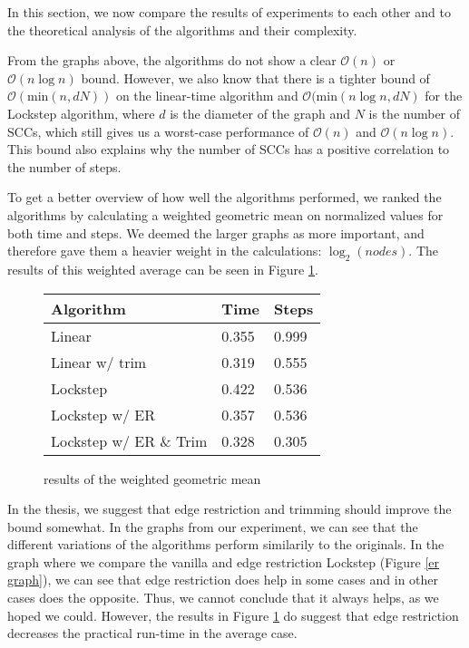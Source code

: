 \documentclass[../master/master.tex]{subfiles}
\begin{document}
In this section, we now compare the results of experiments to each other and to the theoretical analysis of the algorithms and their complexity.

From the graphs above, the algorithms do not show a clear $\mathcal{O}(n)$ or $\mathcal{O}(n\log n)$ bound. However, we also know that there is a tighter bound of $\mathcal{O}(\text{min}(n, dN))$ on the linear-time algorithm and $\mathcal{O}(\text{min}(n\log n, dN)$ for the Lockstep algorithm, where $d$ is the diameter of the graph and $N$ is the number of SCCs, which still gives us a worst-case performance of $\mathcal{O}(n)$ and $\mathcal{O}(n\log n)$. This bound also explains why the number of SCCs has a positive correlation to the number of steps.

To get a better overview of how well the algorithms performed, we ranked the algorithms by calculating a weighted geometric mean on normalized values for both time and steps. We deemed the larger graphs as more important, and therefore gave them a heavier weight in the calculations: $\log_2(nodes)$. The results of this weighted average can be seen in Figure \ref{mean}.

\begin{figure}[h]
  \centering
  \begin{tabular}{|l|l|l|}
    \hline
    Algorithm              & Time   & Steps  \\
    \hline
    Linear                 & 0.355 & 0.999 \\
    \hline
    Linear w/ trim         & 0.319 & 0.555 \\
    \hline
    Lockstep               & 0.422 & 0.536 \\
    \hline
    Lockstep w/ ER         & 0.357 & 0.536 \\
    \hline
    Lockstep w/ ER \& Trim & 0.328 & 0.305 \\
    \hline
\end{tabular}
\caption{results of the weighted geometric mean}\label{mean}
\end{figure}

In the thesis, we suggest that edge restriction and trimming should improve the bound somewhat. In the graphs from our experiment, we can see that the different variations of the algorithms perform similarily to the originals. In the graph where we compare the vanilla and edge restriction Lockstep (Figure \ref{er graph}), we can see that edge restriction does help in some cases and in other cases does the opposite. Thus, we cannot conclude that it always helps, as we hoped we could. However, the results in Figure \ref{mean} do suggest that edge restriction decreases the practical run-time in the average case. 
\end{document}
